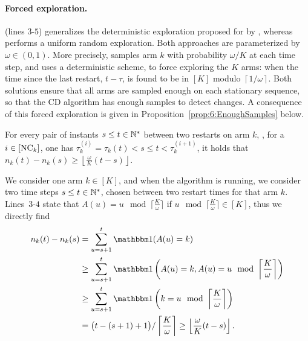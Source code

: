 \paragraph{Forced exploration.}
%
\GLRklUCB{} (lines $3$-$5$) generalizes the deterministic exploration proposed for \MUCB{} by \cite{CaoZhenKvetonXie18}, whereas \CUSUMUCB{} performs a uniform random exploration.
Both approaches are parameterized by $\omega\in(0,1)$.
More precisely, \CUSUMUCB{} samples arm $k$ with probability $\omega/K$ at each time step,
and \MUCB{} uses a deterministic scheme, to force exploring the $K$ arms: when the time since the last restart, $t - \tau$, is found to be in $[K]$ modulo $\left\lceil 1/\omega \right\rceil$.
Both solutions ensure that all arms are sampled enough on each stationary sequence, so that the CD algorithm has enough \iid{} samples to detect changes.
%
A consequence of this forced exploration is given in Proposition~\ref{prop:6:EnoughSamples} below.

\begin{proposition}\label{prop:6:EnoughSamples}
\begin{leftbar}[propositionbar]  %
    For every pair of instants $s \leq t\in\mathbb{N}^*$ between two restarts on arm $k$, \ie, for a $i\in[\text{NC}_k]$, one has $\tau_k^{(i)} = \tau_k(t) < s \leq t < \tau_k^{(i+1)}$, it holds that
    $n_k(t) - n_k(s) \geq \left\lfloor \frac{\omega}{K} (t-s) \right\rfloor$.
\end{leftbar}  %
\end{proposition}

\begin{smallproof}
    We consider one arm $k\in[K]$, and when the \GLRklUCB{} algorithm is running,
    we consider two time steps $s\leq t\in\mathbb{N}^*$, chosen between two restart times for that arm $k$.
    Lines~$3$-$4$ state that $A(u) = u \mod \lceil \frac{K}{\omega} \rceil$
    if $u \mod \lceil \frac{K}{\omega} \rceil \in [K]$,
    thus we directly find
    \begin{align*}
        n_k(t) - n_k(s)
        & = \sum_{u=s+1}^{t} \indic(A(u) = k) \\
        & \geq \sum_{u=s+1}^{t} \indic\left(A(u) = k, A(u) = u \mod \left\lceil \frac{K}{\omega} \right\rceil\right) \\
        & \geq \sum_{u=s+1}^{t} \indic\left(k = u \mod \left\lceil \frac{K}{\omega} \right\rceil\right) \\
        & = \bigl(t - (s+1) + 1\bigr) / \left\lceil \frac{K}{\omega} \right\rceil
        \geq \left\lfloor \frac{\omega}{K} (t - s) \right\rfloor.
    \end{align*}
\end{smallproof}


